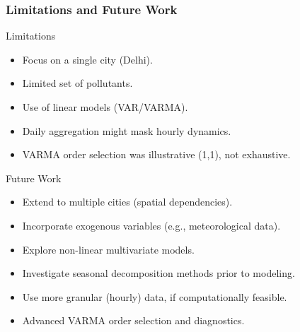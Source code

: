\documentclass[svgnames, 12pt]{beamer}
\begin{document}
\begin{frame}
    \frametitle{Limitations and Future Work}
    \begin{block}{Limitations}
        \begin{itemize}
            \item Focus on a single city (Delhi).
            \item Limited set of pollutants.
            \item Use of linear models (VAR/VARMA).
            \item Daily aggregation might mask hourly dynamics.
            \item VARMA order selection was illustrative (1,1), not exhaustive.
        \end{itemize}
    \end{block}
    \vspace{0.5cm}
    \begin{block}{Future Work}
        \begin{itemize}
            \item Extend to multiple cities (spatial dependencies).
            \item Incorporate exogenous variables (e.g., meteorological data).
            \item Explore non-linear multivariate models.
            \item Investigate seasonal decomposition methods prior to modeling.
            \item Use more granular (hourly) data, if computationally feasible.
            \item Advanced VARMA order selection and diagnostics.
        \end{itemize}
    \end{block}
\end{frame}

\end{document}
